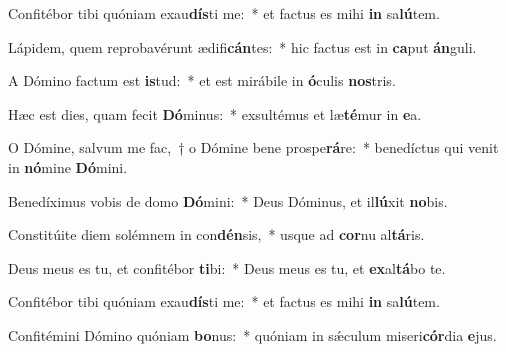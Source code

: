 \item Confitébor tibi quóniam exau\textbf{dís}ti me:~* et factus es mihi \textbf{in} sa\textbf{lú}tem.
\item Lápidem, quem reprobavérunt ædifi\textbf{cán}tes:~* hic factus est in \textbf{ca}put \textbf{án}guli.
\item A Dómino factum est \textbf{is}tud:~* et est mirábile in \textbf{ó}culis \textbf{nos}tris.
\item Hæc est dies, quam fecit \textbf{Dó}minus:~* exsultémus et læ\textbf{té}mur in \textbf{e}a.
\item O Dómine, salvum me fac,~† o Dómine bene prospe\textbf{rá}re:~* benedíctus qui venit in \textbf{nó}mine \textbf{Dó}mini.
\item Benedíximus vobis de domo \textbf{Dó}mini:~* Deus Dóminus, et il\textbf{lú}xit \textbf{no}bis.
\item Constitúite diem solémnem in con\textbf{dén}sis,~* usque ad \textbf{cor}nu al\textbf{tá}ris.
\item Deus meus es tu, et confitébor \textbf{ti}bi:~* Deus meus es tu, et \textbf{ex}al\textbf{tá}bo te.
\item Confitébor tibi quóniam exau\textbf{dís}ti me:~* et factus es mihi \textbf{in} sa\textbf{lú}tem.
\item Confitémini Dómino quóniam \textbf{bo}nus:~* quóniam in sǽculum miseri\textbf{cór}dia \textbf{e}jus.
